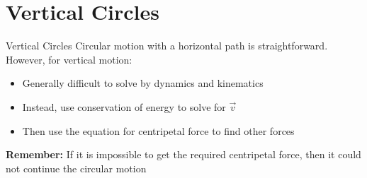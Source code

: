 \documentclass[12pt,compress,aspectratio=169]{beamer}
\begin{document}
\section{Vertical Circles}

\begin{frame}{Vertical Circles}
  Circular motion with a horizontal path is straightforward. However, for
  vertical motion:
  \begin{itemize}
  \item Generally difficult to solve by dynamics and kinematics
  \item Instead, use conservation of energy to solve for $\vec v$
  \item Then use the equation for centripetal force to find other forces
  \end{itemize}

  \textbf{Remember:} If it is impossible to get the required centripetal
  force, then it could not continue the circular motion
\end{frame}
\end{document}
